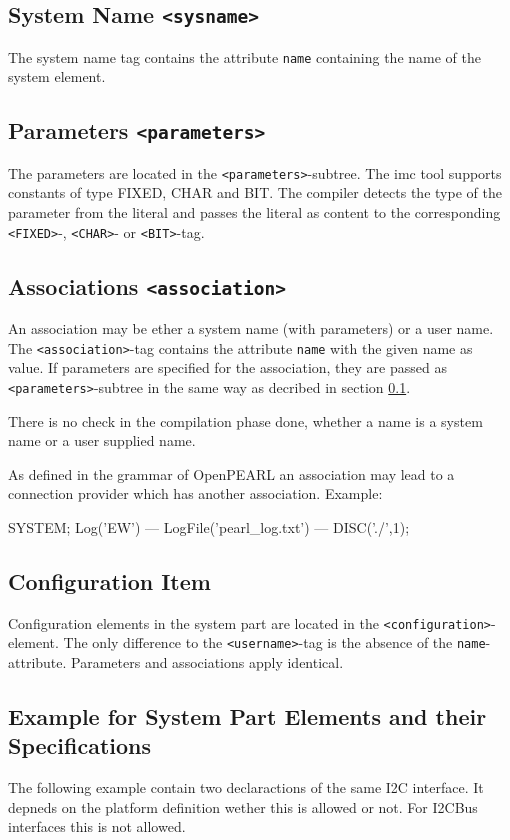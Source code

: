 \subsection{System Name \texttt{<sysname>}}
\label{sec_system_names}
The system name tag contains the attribute \verb|name| containing the 
name of the system element.

\subsection{Parameters \texttt{<parameters>}}
The parameters are located in the \verb|<parameters>|-subtree.
The imc tool supports constants of type FIXED, CHAR and BIT.
The compiler detects  the type of the parameter
from the literal and passes the literal as content to the corresponding
\verb|<FIXED>|-, \verb|<CHAR>|- or \verb|<BIT>|-tag.

\subsection{Associations \texttt{<association>}}
An association may be ether a system name (with parameters) or a user name.
The  \verb|<association>|-tag contains the attribute \verb|name| with the 
given name as value. If parameters are specified for the association,
they are passed as \verb|<parameters>|-subtree in the same way as decribed 
in section \ref{sec_system_names}.

There is no check in the compilation phase done,
whether a name is a system name
or a user supplied name.

As defined in the grammar of OpenPEARL an association may lead to a 
connection provider which has another association.
Example:
\begin{PEARLCode}
SYSTEM;
  Log('EW') --- LogFile('pearl_log.txt') --- DISC('./',1);
\end{PEARLCode}

\subsection{Configuration Item}
Configuration elements in the system part are located in the
\verb|<configuration>|-element. 
The only difference to the \verb|<username>|-tag is the absence of the 
\verb|name|-attribute. Parameters and associations apply identical.

\subsection{Example for System Part Elements and their Specifications}
The following example contain two declaractions of the same I2C interface.
It depneds on the platform definition wether this is allowed or not. For I2CBus 
interfaces this is not allowed.

